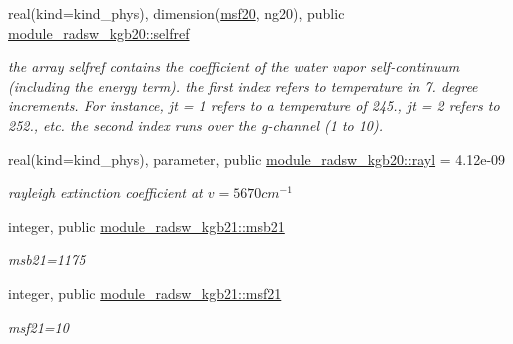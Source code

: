 \begin{DoxyCompactItemize}
\mbox{\label{group__module__radsw__kgbnn_gaa3853af5e29277f9ed2bdd397cab5029}} 
real(kind=kind\+\_\+phys), dimension(\hyperlink{group__module__radsw__kgbnn_ga925dc2da02eef4edcf000a14525a7c7e}{msf20}, ng20), public \hyperlink{group__module__radsw__kgbnn_gaa3853af5e29277f9ed2bdd397cab5029}{module\+\_\+radsw\+\_\+kgb20\+::selfref}
\begin{DoxyCompactList}\small\item\em the array selfref contains the coefficient of the water vapor self-\/continuum (including the energy term). the first index refers to temperature in 7. degree increments. For instance, jt = 1 refers to a temperature of 245., jt = 2 refers to 252., etc. the second index runs over the g-\/channel (1 to 10). \end{DoxyCompactList}\item 
\mbox{\label{group__module__radsw__kgbnn_ga6a00db6ce81c299d44ef5eadc1fe3b5b}} 
real(kind=kind\+\_\+phys), parameter, public \hyperlink{group__module__radsw__kgbnn_ga6a00db6ce81c299d44ef5eadc1fe3b5b}{module\+\_\+radsw\+\_\+kgb20\+::rayl} = 4.\+12e-\/09
\begin{DoxyCompactList}\small\item\em rayleigh extinction coefficient at $v=5670cm^{-1}$ \end{DoxyCompactList}\item 
\mbox{\label{group__module__radsw__kgbnn_ga59710ca5b31c30385ea968c0f01e2e81}} 
integer, public \hyperlink{group__module__radsw__kgbnn_ga59710ca5b31c30385ea968c0f01e2e81}{module\+\_\+radsw\+\_\+kgb21\+::msb21}
\begin{DoxyCompactList}\small\item\em msb21=1175 \end{DoxyCompactList}\item 
\mbox{\label{group__module__radsw__kgbnn_gae70b5abfa847419cbf189d2502c34ddd}} 
integer, public \hyperlink{group__module__radsw__kgbnn_gae70b5abfa847419cbf189d2502c34ddd}{module\+\_\+radsw\+\_\+kgb21\+::msf21}
\begin{DoxyCompactList}\small\item\em msf21=10 \end{DoxyCompactList}\item 
\mbox{\label{group__module__radsw__kgbnn_ga5575239aa9d55abcca1ac1f82dc4c4ec}} 

\end{DoxyCompactItemize}
